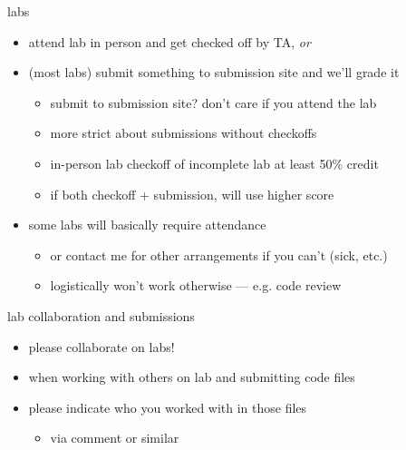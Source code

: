 \begin{frame}{labs}
    \begin{itemize}
    \item attend lab in person and get checked off by TA, \textit{or}
    \item (most labs) submit something to submission site and we'll grade it
        \begin{itemize}
        \item submit to submission site? don't care if you attend the lab
        \item more strict about submissions without checkoffs
        \item in-person lab checkoff of incomplete lab at least 50\% credit
        \item if both checkoff + submission, will use higher score
        \end{itemize}
    \item some labs will basically require attendance
        \begin{itemize}
        \item or contact me for other arrangements if you can't (sick, etc.)
        \item logistically won't work otherwise --- e.g. code review
        \end{itemize}
    \end{itemize}
\end{frame}

\begin{frame}{lab collaboration and submissions}
    \begin{itemize}
    \item please collaborate on labs!
    \vspace{.5cm}
    \item when working with others on lab and submitting code files
    \item please indicate who you worked with in those files
        \begin{itemize}
        \item via comment or similar
        \end{itemize}
    \end{itemize}
\end{frame}
